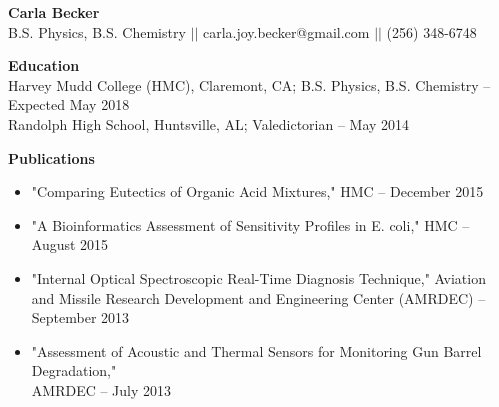 \documentclass[9pt]{article}
\begin{document}
{\centering \Large \bf Carla Becker \\}
{\centering B.S. Physics, B.S. Chemistry $\vert \vert$ carla.joy.becker@gmail.com $\vert \vert$ (256) 348-6748 \\}

\noindent
{\bf Education \\}
Harvey Mudd College (HMC), Claremont, CA; B.S. Physics, B.S. Chemistry \--- Expected May 2018 \\
Randolph High School, Huntsville, AL; Valedictorian \--- May 2014 
\vspace{3mm}

\linespread{1}

\noindent
{\bf Publications \\}
\vspace{-8mm}
\begin{itemize}[leftmargin=3.75mm]
	\setlength{\itemsep}{0pt}
    \setlength{\parskip}{0pt}
    \setlength{\parsep}{0pt}
\item "Comparing Eutectics of Organic Acid Mixtures," HMC \--- December 2015
\item "A Bioinformatics Assessment of Sensitivity Profiles in E. coli," HMC \--- August 2015
\item "Internal Optical Spectroscopic Real-Time Diagnosis Technique,"  Aviation and Missile Research Development and Engineering Center (AMRDEC) \--- September 2013
\item "Assessment of Acoustic and Thermal Sensors for Monitoring Gun Barrel Degradation," \\ AMRDEC \--- July 2013
\end{itemize}
\end{document}
